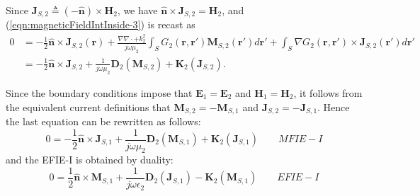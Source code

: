 \documentclass[a4paper,10pt]{book}
\newcommand{\field}[1]{\mathbf{#1}}
\newcommand{\current}[1]{\mathbf{#1}}
\newcommand{\vect}[1]{\mathbf{#1}}
\newcommand{\operator}[1]{\mathbf{#1}}
\begin{document}
Since $\current{J}_{S,2} \triangleq (-\vect{\hat{n}}) \times \field{H}_2$, we have $\vect{\hat{n}} \times \current{J}_{S,2} = \field{H}_2$, and (\ref{eqn:magneticFieldIntInside-3}) is recast as
\begin{equation}\label{eqn:magneticFieldIntInside-4}
\begin{split}
0 &= - \frac{1}{2} \vect{\hat{n}} \times \current{J}_{S,2}\left(\vect{r}\right) + \frac{\nabla \nabla \cdot + k_2^2}{j \omega \mu_2} \int_S G_2(\vect{r}, \vect{r}') \current{M}_{S,2}\left(\vect{r}'\right) d\vect{r}' +  \int_S \nabla G_2(\vect{r}, \vect{r}') \times \current{J}_{S,2}\left(\vect{r}'\right) d\vect{r}' \\
&=  - \frac{1}{2} \vect{\hat{n}} \times \current{J}_{S,2} + \frac{1}{j \omega \mu_2} \operator{D}_2\left(\current{M}_{S,2}\right) +  \operator{K}_2\left( \current{J}_{S,2}\right).
\end{split}
\end{equation}

%
\par
Since the boundary conditions impose that $\field{E}_1 = \field{E}_2$ and $\field{H}_1 = \field{H}_2$, it follows from the equivalent current definitions that $\current{M}_{S,2} = -\current{M}_{S,1}$ and $\current{J}_{S,2} = -\current{J}_{S,1}$. Hence the last equation can be rewritten as follows:
\begin{equation}\label{eqn:MFIE-I}
\boxed{
0 = - \frac{1}{2} \vect{\hat{n}} \times \current{J}_{S,1} + \frac{1}{j \omega \mu_2} \operator{D}_2\left(\current{M}_{S,1}\right) +  \operator{K}_2\left( \current{J}_{S,1}\right)
} \qquad MFIE-I
\end{equation}
and the EFIE-I is obtained by duality:
\begin{equation}\label{eqn:EFIE-I}
\boxed{
0 = \frac{1}{2} \vect{\hat{n}} \times \current{M}_{S,1} + \frac{1}{j \omega \epsilon_2} \operator{D}_2\left(\current{J}_{S,1}\right) -  \operator{K}_2\left( \current{M}_{S,1}\right)
} \qquad EFIE-I
\end{equation}
\end{document}
